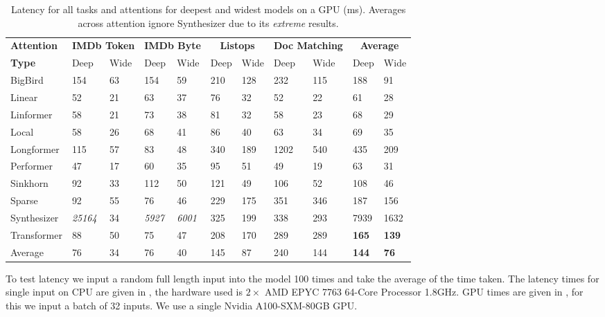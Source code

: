 \begin{table}[!h]
    \caption{Latency for all tasks and attentions for deepest and widest models on a GPU (ms). Averages across attention ignore Synthesizer due to its \emph{extreme} results.}
    \label{table:gpu_latency}
    \begin{center}
        \begin{tabular}{l | l l l l l l l l | l l}
            \toprule
            {\bf Attention} & \multicolumn{2}{c}{\bf IMDb Token} & \multicolumn{2}{c}{\bf IMDb Byte} & \multicolumn{2}{c}{\bf Listops} & \multicolumn{2}{c}{\bf Doc Matching} & \multicolumn{2}{c}{\bf Average} \\
            {\bf Type} & Deep & Wide & Deep & Wide & Deep & Wide & Deep & Wide & Deep & Wide \\
            \midrule
BigBird     & 154          & 63 & 154 & 59 & 210 & 128 & 232  & 115 & 188 & 91 \\
Linear      & 52           & 21 & 63 & 37  & 76  & 32 & 52    & 22 & 61 & 28 \\
Linformer   & 58           & 21 & 73 & 38  & 81  & 32 & 58    & 23 & 68 & 29 \\
Local       & 58           & 26 & 68 & 41  & 86  & 40 & 63    & 34 & 69 & 35 \\
Longformer  & 115          & 57 & 83 & 48  & 340 & 189 & 1202 & 540 & 435 & 209 \\
Performer   & 47           & 17 & 60 & 35  & 95  & 51 & 49    & 19 & 63 & 31 \\
Sinkhorn    & 92           & 33 & 112 & 50 & 121 & 49 & 106   & 52 & 108 & 46 \\
Sparse      & 92           & 55 & 76 & 46  & 229 & 175 & 351  & 346 & 187 & 156 \\
Synthesizer & \emph{25164} & 34 & \emph{5927} & \emph{6001}   & 325 & 199 & 338 & 293 & 7939 & 1632 \\
Transformer & 88           & 50 & 75 & 47  & 208 & 170 & 289  & 289 & \textbf{165} & \textbf{139} \\
\bottomrule
Average     & 76           & 34 & 76 & 40  & 145 & 87  & 240  & 144 & \textbf{144} & \textbf{76} \\
        \end{tabular}
    \end{center}
\end{table}

To test latency we input a random full length input into the model 100 times and take the average of the time taken.
The latency times for single input on CPU are given in , the hardware used is $2\times$ AMD EPYC 7763 64-Core Processor 1.8GHz.
GPU times are given in , for this we input a batch of 32 inputs.
We use a single Nvidia A100-SXM-80GB GPU.


